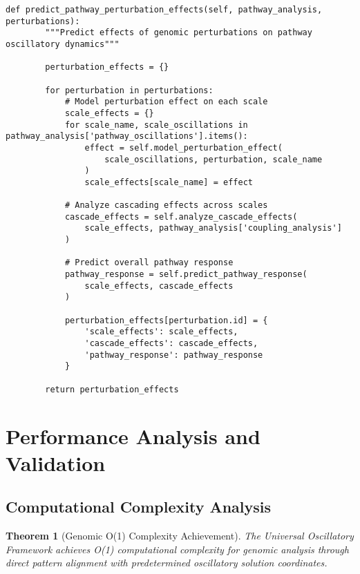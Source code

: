 \documentclass[12pt,a4paper]{article}
\newtheorem{theorem}{Theorem}
\begin{document}
\begin{lstlisting}[style=pythonstyle, caption=Multi-Scale Genomic Pathway Oscillatory Analysis]
    def predict_pathway_perturbation_effects(self, pathway_analysis, perturbations):
        """Predict effects of genomic perturbations on pathway oscillatory dynamics"""
        
        perturbation_effects = {}
        
        for perturbation in perturbations:
            # Model perturbation effect on each scale
            scale_effects = {}
            for scale_name, scale_oscillations in pathway_analysis['pathway_oscillations'].items():
                effect = self.model_perturbation_effect(
                    scale_oscillations, perturbation, scale_name
                )
                scale_effects[scale_name] = effect
            
            # Analyze cascading effects across scales
            cascade_effects = self.analyze_cascade_effects(
                scale_effects, pathway_analysis['coupling_analysis']
            )
            
            # Predict overall pathway response
            pathway_response = self.predict_pathway_response(
                scale_effects, cascade_effects
            )
            
            perturbation_effects[perturbation.id] = {
                'scale_effects': scale_effects,
                'cascade_effects': cascade_effects,
                'pathway_response': pathway_response
            }
        
        return perturbation_effects
\end{lstlisting}

\section{Performance Analysis and Validation}

\subsection{Computational Complexity Analysis}

\begin{theorem}[Genomic O(1) Complexity Achievement]
The Universal Oscillatory Framework achieves O(1) computational complexity for genomic analysis through direct pattern alignment with predetermined oscillatory solution coordinates.
\end{theorem}
\end{document}
